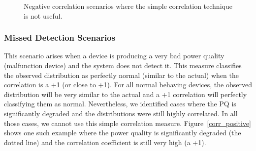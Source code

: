 \begin{figure}[!p]
\centering
{}

\vspace{1cm}

\vspace{0.5cm}
\caption{Negative correlation scenarios where the simple correlation technique is not useful.} 
\vspace{01cm}
\label{correlationAnalysisNegative}
\end{figure}

\subsubsection{Missed Detection Scenarios}
This scenario arises when a device is producing a very bad power quality (malfunction device) and the system does not detect it. This measure classifies the observed distribution as perfectly normal (similar to the actual) when the correlation is a +1 (or close to +1). For all normal behaving devices, the observed distribution will be very similar to the actual and a +1 correlation will perfectly classifying them as normal. Nevertheless, we identified cases where the PQ is significantly degraded and the distributions were still highly correlated. In all those cases, we cannot use this simple correlation measure. Figure~\ref{corr_positive} shows one such example where the power quality is significantly degraded (the dotted line) and the correlation coefficient is still very high (a +1).

